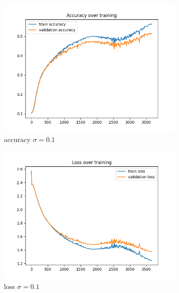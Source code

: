 \documentclass[a4paper]{article}
\begin{document}
\begin{figure}[h]
	\centering
	\begin{subfigure}{0.3\textwidth}
		\centering
		\includegraphics[width=\linewidth]{images/sens_sigma_0.1_use_bn_True_acc.png}
		\caption{accuracy $\sigma=0.1$}
	\end{subfigure}
	\begin{subfigure}{0.3\textwidth}
		\centering
		\includegraphics[width=\linewidth]{images/sens_sigma_0.1_use_bn_True_loss.png}
		\caption{loss $\sigma=0.1$}
	\end{subfigure}
	\begin{subfigure}{0.3\textwidth}
		\centering

\end{subfigure}
\end{figure}
\end{document}

